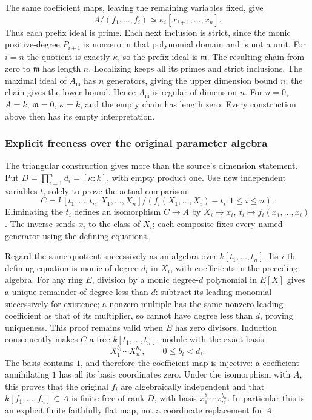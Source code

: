The same coefficient maps, leaving the remaining variables fixed, give \[
 A/(f_1,\ldots,f_i)\simeq
 \kappa_i[x_{i+1},\ldots,x_n].
\] Thus each prefix ideal is prime. Each next inclusion is strict, since the monic positive-degree \(P_{i+1}\) is nonzero in that polynomial domain and is not a unit. For \(i=n\) the quotient is exactly \(\kappa\), so the prefix ideal is \(\mathfrak m\). The resulting chain from zero to \(\mathfrak m\) has length \(n\). Localizing keeps all its primes and strict inclusions. The maximal ideal of \(A_{\mathfrak m}\) has \(n\) generators, giving the upper dimension bound \(n\); the chain gives the lower bound. Hence \(A_{\mathfrak m}\) is regular of dimension \(n\). For \(n=0\), \(A=k\), \(\mathfrak m=0\), \(\kappa=k\), and the empty chain has length zero. Every construction above then has its empty interpretation.

\subsubsection{Explicit freeness over the original parameter algebra}\label{algebra-proof-025-explicit-freeness-over-the-original-parameter-algebra}

The triangular construction gives more than the source's dimension statement. Put \(D=\prod_{i=1}^n d_i=[\kappa:k]\), with empty product one. Use new independent variables \(t_i\) solely to prove the actual comparison: \[
 C=k[t_1,\ldots,t_n,X_1,\ldots,X_n]/
       (f_i(X_1,\ldots,X_i)-t_i:1\leq i\leq n).
\] Eliminating the \(t_i\) defines an isomorphism \(C\to A\) by \(X_i\mapsto x_i,\ t_i\mapsto f_i(x_1,\ldots,x_i)\). The inverse sends \(x_i\) to the class of \(X_i\); each composite fixes every named generator using the defining equations.

Regard the same quotient successively as an algebra over \(k[t_1,\ldots,t_n]\). Its \(i\)-th defining equation is monic of degree \(d_i\) in \(X_i\), with coefficients in the preceding algebra. For any ring \(E\), division by a monic degree-\(d\) polynomial in \(E[X]\) gives a unique remainder of degree less than \(d\): subtract its leading monomial successively for existence; a nonzero multiple has the same nonzero leading coefficient as that of its multiplier, so cannot have degree less than \(d\), proving uniqueness. This proof remains valid when \(E\) has zero divisors. Induction consequently makes \(C\) a free \(k[t_1,\ldots,t_n]\)-module with the exact basis \[
 X_1^{b_1}\cdots X_n^{b_n},\qquad 0\leq b_i<d_i.
\] The basis contains \(1\), and therefore the coefficient map is injective: a coefficient annihilating \(1\) has all its basis coordinates zero. Under the isomorphism with \(A\), this proves that the original \(f_i\) are algebraically independent and that \(k[f_1,\ldots,f_n]\subset A\) is finite free of rank \(D\), with basis \(x_1^{b_1}\cdots x_n^{b_n}\). In particular this is an explicit finite faithfully flat map, not a coordinate replacement for \(A\).

